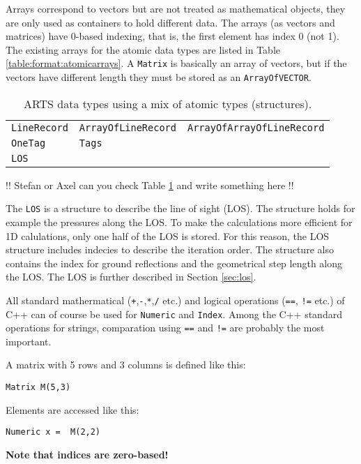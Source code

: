  \label{sec:formats:atomic_arrays}
 
Arrays correspond to vectors but are not treated as mathematical
objects, they are only used as containers to hold different data.
The arrays (as vectors and matrices) have 0-based indexing, that is,
the first element has index 0 (not 1). The existing arrays for the
atomic data types are listed in Table \ref{table:format:atomicarrays}.
A \verb|Matrix| is basically an array of vectors, but if the vectors
have different length they must be stored as an \verb|ArrayOfVECTOR|.


 \label{sec:formats:others}

 \begin{table}[t]
  \begin{tabular}{l l l}
   \verb|LineRecord| & \verb|ArrayOfLineRecord| & \verb|ArrayOfArrayOfLineRecord| \\
   \verb|OneTag|     & \verb|Tags|   & \\
   \verb|LOS| & & \\
  \end{tabular}
  \caption{ARTS data types using a mix of atomic types (structures).}
  \label{table:format:structures}
 \end{table}
 
!! Stefan or Axel can you check Table \ref{table:format:structures} and
write something here !!

The \verb|LOS| is a structure to describe the line of sight (LOS).
The structure holds for example the pressures along the LOS. To make the
calculations more efficient for 1D calulations, only one half of the
LOS is stored.  For this reason, the LOS structure includes indecies
to describe the iteration order. The structure also contains the
index for ground reflections and the geometrical step length along
the LOS. The LOS is further described in Section \ref{sec:los}.


\label{sec:formats:maths}
 
All standard mathermatical (\verb|+|,\verb|-|,\verb|*|,\verb|/| etc.)
and logical operations (\verb|==|, \verb|!=| etc.) of C++ can of
course be used for \verb|Numeric| and \verb|Index|. Among the C++
standard operations for strings, comparation using \verb|==| and
\verb|!=| are probably the most important.

 
 
A matrix with 5 rows and 3 columns is defined like this:
\begin{verbatim}
Matrix M(5,3)
\end{verbatim}
Elements are accessed like this:
\begin{verbatim}
Numeric x =  M(2,2)
\end{verbatim}
\textbf{Note that indices are zero-based!}


